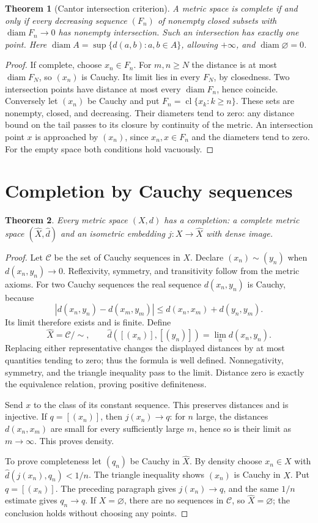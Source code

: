 \documentclass[11pt,oneside,openany]{book}
\newtheorem{theorem}{Theorem}[chapter]
\theoremstyle{definition}
\theoremstyle{remark}
\DeclareMathOperator{\cl}{cl}
\DeclareMathOperator{\diam}{diam}
\begin{document}
\begin{theorem}[Cantor intersection criterion]\label{d10:09:cantor-intersection}
A metric space is complete if and only if every decreasing sequence $(F_n)$ of nonempty closed subsets with $\diam F_n\to0$ has nonempty intersection. Such an intersection has exactly one point. Here $\diam A=\sup\{d(a,b):a,b\in A\}$, allowing $+\infty$, and $\diam\varnothing=0$.
\end{theorem}
\begin{proof}
If complete, choose $x_n\in F_n$. For $m,n\geq N$ the distance is at most $\diam F_N$, so $(x_n)$ is Cauchy. Its limit lies in every $F_N$, by closedness. Two intersection points have distance at most every $\diam F_n$, hence coincide. Conversely let $(x_n)$ be Cauchy and put $F_n=\cl\{x_k:k\geq n\}$. These sets are nonempty, closed, and decreasing. Their diameters tend to zero: any distance bound on the tail passes to its closure by continuity of the metric. An intersection point $x$ is approached by $(x_n)$, since $x_n,x\in F_n$ and the diameters tend to zero. For the empty space both conditions hold vacuously.
\end{proof}

\section{Completion by Cauchy sequences}
\begin{theorem}\label{d10:09:completion}
Every metric space $(X,d)$ has a completion: a complete metric space $(\widehat X,\widehat d)$ and an isometric embedding $j:X\to\widehat X$ with dense image.
\end{theorem}
\begin{proof}
Let $\mathcal C$ be the set of Cauchy sequences in $X$. Declare $(x_n)\sim(y_n)$ when $d(x_n,y_n)\to0$. Reflexivity, symmetry, and transitivity follow from the metric axioms. For two Cauchy sequences the real sequence $d(x_n,y_n)$ is Cauchy, because
\[
 |d(x_n,y_n)-d(x_m,y_m)|\leq d(x_n,x_m)+d(y_n,y_m).
\]
Its limit therefore exists and is finite. Define
\[
 \widehat X=\mathcal C/{\sim},\qquad
 \widehat d([(x_n)],[(y_n)])=\lim_n d(x_n,y_n).
\]
Replacing either representative changes the displayed distances by at most quantities tending to zero; thus the formula is well defined. Nonnegativity, symmetry, and the triangle inequality pass to the limit. Distance zero is exactly the equivalence relation, proving positive definiteness.

Send $x$ to the class of its constant sequence. This preserves distances and is injective. If $q=[(x_n)]$, then $j(x_n)\to q$: for $n$ large, the distances $d(x_n,x_m)$ are small for every sufficiently large $m$, hence so is their limit as $m\to\infty$. This proves density.

To prove completeness let $(q_n)$ be Cauchy in $\widehat X$. By density choose $x_n\in X$ with $\widehat d(j(x_n),q_n)<1/n$. The triangle inequality shows $(x_n)$ is Cauchy in $X$. Put $q=[(x_n)]$. The preceding paragraph gives $j(x_n)\to q$, and the same $1/n$ estimate gives $q_n\to q$. If $X=\varnothing$, there are no sequences in $\mathcal C$, so $\widehat X=\varnothing$; the conclusion holds without choosing any points.
\end{proof}
\end{document}
